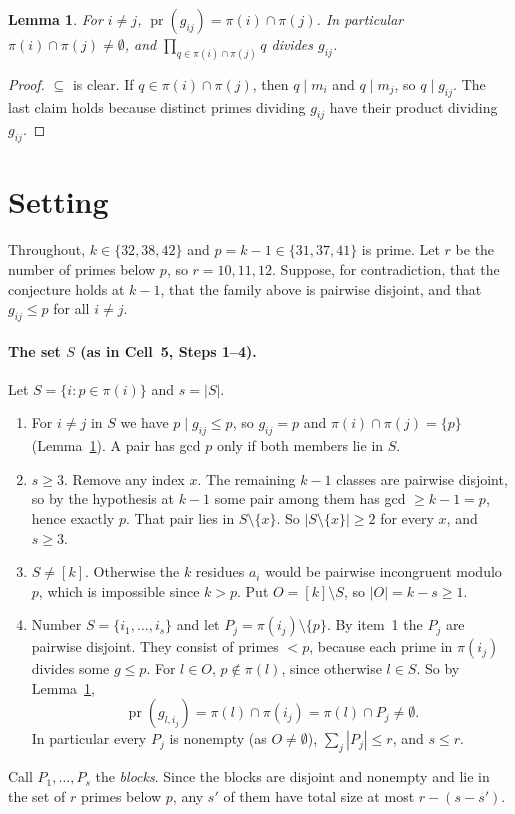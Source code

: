 \documentclass[11pt]{article}
\newtheorem{lemma}[theorem]{Lemma}
\theoremstyle{definition}
\theoremstyle{remark}
\newcommand{\pr}{\operatorname{pr}}
\begin{document}
\begin{lemma}\label{lem:channel}
For $i\ne j$, $\pr(g_{ij})=\pi(i)\cap\pi(j)$. In particular $\pi(i)\cap\pi(j)\ne\emptyset$, and
$\prod_{q\in\pi(i)\cap\pi(j)}q$ divides $g_{ij}$.
\end{lemma}
\begin{proof}
$\subseteq$ is clear. If $q\in\pi(i)\cap\pi(j)$, then $q\mid m_i$ and $q\mid m_j$, so
$q\mid g_{ij}$. The last claim holds because distinct primes dividing $g_{ij}$ have their product
dividing $g_{ij}$.
\end{proof}

\section{Setting}

Throughout, $k\in\{32,38,42\}$ and $p=k-1\in\{31,37,41\}$ is prime. Let $r$ be the number of primes
below $p$, so $r=10,11,12$. Suppose, for contradiction, that the conjecture holds at $k-1$, that
the family above is pairwise disjoint, and that $g_{ij}\le p$ for all $i\ne j$.

\paragraph{The set $S$ (as in Cell~5, Steps 1--4).} Let $S=\{i:p\in\pi(i)\}$ and $s=|S|$.
\begin{enumerate}
\item For $i\ne j$ in $S$ we have $p\mid g_{ij}\le p$, so $g_{ij}=p$ and
  $\pi(i)\cap\pi(j)=\{p\}$ (Lemma~\ref{lem:channel}). A pair has gcd $p$ only if both
  members lie in $S$.
\item $s\ge3$. Remove any index $x$. The remaining $k-1$ classes are pairwise disjoint, so by the
  hypothesis at $k-1$ some pair among them has gcd $\ge k-1=p$, hence exactly $p$. That pair
  lies in $S\setminus\{x\}$. So $|S\setminus\{x\}|\ge2$ for every $x$, and $s\ge3$.
\item $S\ne[k]$. Otherwise the $k$ residues $a_i$ would be pairwise incongruent modulo $p$, which
  is impossible since $k>p$. Put $O=[k]\setminus S$, so $|O|=k-s\ge1$.
\item Number $S=\{i_1,\dots,i_s\}$ and let $P_j=\pi(i_j)\setminus\{p\}$. By item~1 the $P_j$ are
  pairwise disjoint. They consist of primes $<p$, because each prime in $\pi(i_j)$ divides some
  $g\le p$. For $l\in O$, $p\notin\pi(l)$, since otherwise $l\in S$. So by
  Lemma~\ref{lem:channel},
  \begin{equation}\label{eq:chan}
    \pr(g_{l,i_j})=\pi(l)\cap\pi(i_j)=\pi(l)\cap P_j\ne\emptyset .
  \end{equation}
  In particular every $P_j$ is nonempty (as $O\ne\emptyset$), $\sum_j|P_j|\le r$, and $s\le r$.
\end{enumerate}
Call $P_1,\dots,P_s$ the \emph{blocks}. Since the blocks are disjoint and nonempty and lie in the
set of $r$ primes below $p$, any $s'$ of them have total size at most $r-(s-s')$.
\end{document}
